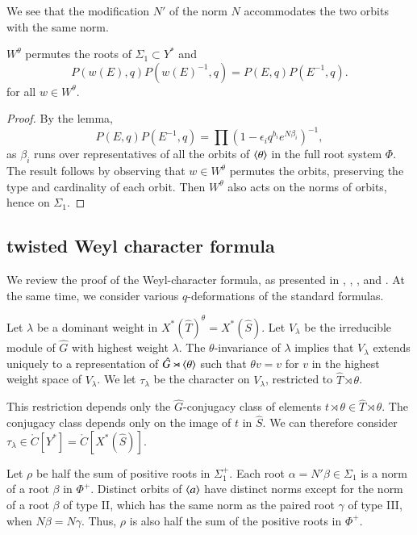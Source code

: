 We see that the modification $N'$ of the norm $N$  accommodates the
two orbits with the same norm.  

\begin{corollary}\label{cor:weyl-p}  $W^\theta$ permutes the roots of $\Sigma_1\subset Y^*$ and
\[
P(w(E),q) P(w(E)^{-1},q) = P(E,q)P(E^{-1},q).
\]
for all $w\in W^\theta$.
\end{corollary}

\begin{proof} 
By the lemma,
\[
P(E,q)P(E^{-1},q) = \prod (1- \epsilon_i q^{b_i} e^{N\beta_i})^{-1},
\]
as $\beta_i$ runs over representatives of all the orbits of $\langle{\theta}\rangle$ in the full root system $\Phi$.
The result follows by observing  that $w\in W^\theta$ permutes the orbits, preserving the type and cardinality of each orbit.
Then $W^\theta$ also acts on the norms of orbits, hence on $\Sigma_1$.
\end{proof}


\subsection{twisted Weyl character formula}

We review the proof of the Weyl-character formula, as presented in \cite{kostant1961lie}, 
\cite{jantzen1977darstellungen}, \cite{wendt2001weyl}, and \cite{kumar2009characters}.
At the same time, we consider various $q$-deformations of the standard formulas.

Let $\lambda$ be a dominant weight in $X^*(\hat T)^\theta = X^*(\hat S)$.  Let $V_\lambda$ be the irreducible module
of $\hat G$ with highest weight $\lambda$.  The $\theta$-invariance of $\lambda$ implies that $V_\lambda$
extends uniquely to a representation of $\hat G \rtimes \langle{\theta}\rangle$ such that $\theta v = v$ for $v$ in the
highest weight space of $V_\lambda$.  We let $\tau_\lambda$ be the character on $V_\lambda$, restricted to $\hat T\rtimes\theta$.

This restriction depends only the $\hat G$-conjugacy class of elements $t\rtimes \theta\in \hat T\rtimes\theta$.
The conjugacy class depends only on the image of $t$ in $\hat S$.  
We can therefore
consider $\tau_\lambda\in \ring{C}[Y^*] = \ring{C}[X^*(\hat S)]$.

Let $\rho$ be half the sum of positive roots in $\Sigma^+_1$.  Each root $\alpha = N'\beta\in \Sigma_1$ 
is a norm of a root $\beta$ in $\Phi^+$.
Distinct orbits of $\langle{a}\rangle$ have distinct norms except for the norm of a root $\beta$ of type II, which has the same norm as the
paired root $\gamma$ of type III, when $N\beta = N\gamma$.  Thus, $\rho$ is also half the sum of the positive roots in $\Phi^+$.

